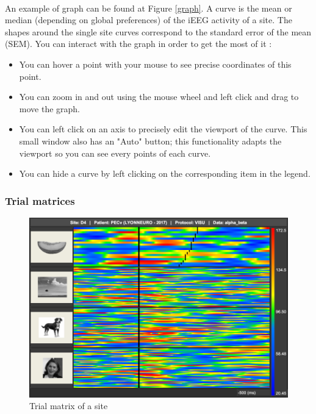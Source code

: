 \documentclass[a4paper]{article}
\begin{document}
\paragraph{} An example of graph can be found at Figure \ref{graph}. A curve is the mean or median (depending on global preferences) of the iEEG activity of a site. The shapes around the single site curves correspond to the standard error of the mean (SEM). You can interact with the graph in order to get the most of it :
\begin{itemize}
\item You can hover a point with your mouse to see precise coordinates of this point.
\item You can zoom in and out using the mouse wheel and left click and drag to move the graph.
\item You can left click on an axis to precisely edit the viewport of the curve. This small window also has an "Auto" button; this functionality adapts the viewport so you can see every points of each curve.
\item You can hide a curve by left clicking on the corresponding item in the legend.
\end{itemize}
\subsubsection{Trial matrices}
\begin{figure}[H]
\begin{center}
\includegraphics[scale=0.35]{TrialMatrix.png}
\end{center}
\caption{\label{trialMatrix}Trial matrix of a site}
\end{figure}
\end{document}
